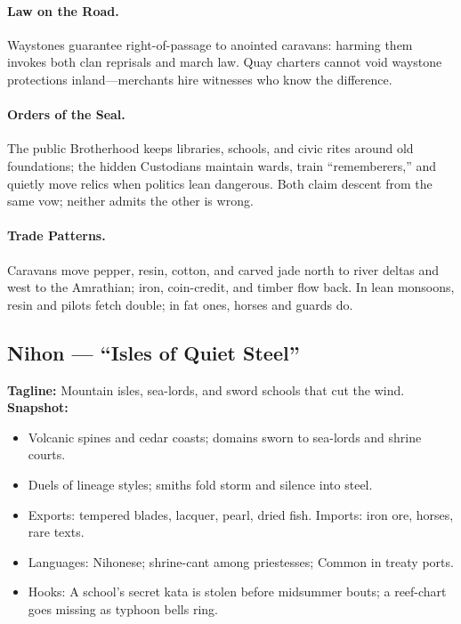 \documentclass[11pt]{article}
\begin{document}
\paragraph{Law on the Road.}
Waystones guarantee right-of-passage to anointed caravans: harming them invokes both clan reprisals and march law. Quay charters cannot void waystone protections inland—merchants hire witnesses who know the difference.

\paragraph{Orders of the Seal.}
The public Brotherhood keeps libraries, schools, and civic rites around old foundations; the hidden Custodians maintain wards, train “rememberers,” and quietly move relics when politics lean dangerous. Both claim descent from the same vow; neither admits the other is wrong.

\paragraph{Trade Patterns.}
Caravans move pepper, resin, cotton, and carved jade north to river deltas and west to the Amrathian; iron, coin-credit, and timber flow back. In lean monsoons, resin and pilots fetch double; in fat ones, horses and guards do.

\subsection*{Nihon — “Isles of Quiet Steel”}
\textbf{Tagline:} Mountain isles, sea-lords, and sword schools that cut the wind.\\
\textbf{Snapshot:}
\begin{itemize}
  \item Volcanic spines and cedar coasts; domains sworn to sea-lords and shrine courts.
  \item Duels of lineage styles; smiths fold storm and silence into steel.
  \item Exports: tempered blades, lacquer, pearl, dried fish. Imports: iron ore, horses, rare texts.
  \item Languages: Nihonese; shrine-cant among priestesses; Common in treaty ports.
  \item Hooks: A school’s secret kata is stolen before midsummer bouts; a reef-chart goes missing as typhoon bells ring.
\end{itemize}
\end{document}
